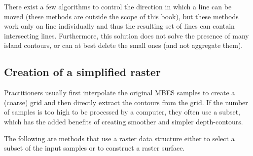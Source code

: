 There exist a few algorithms to control the direction in which a line can be moved (these methods are outside the scope of this book), but these methods work only on line individually and thus the resulting set of lines can contain intersecting lines.
Furthermore, this solution does not solve the presence of many island contours, or can at best delete the small ones (and not aggregate them).

\subsection{Creation of a simplified raster}

Practitioners usually first interpolate the original MBES samples to create a (coarse) grid and then directly extract the contours from the grid.
If the number of samples is too high to be processed by a computer, they often use a subset, which has the added benefits of creating smoother and simpler depth-contours.

%

The following are methods that use a raster data structure either to select a subset of the input samples or to construct a raster surface.


%
